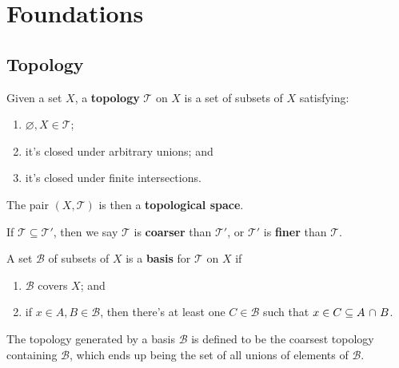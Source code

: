 \documentclass[twoside,10pt]{report}
\begin{document}
\toc


\chapter{Foundations}

\section{Topology}

\begin{defn}[]
Given a set $X$, a \textbf{topology} $\mathcal{T}$ on $X$ is a set of subsets of $X$ satisfying:
\begin{enumerate}
	\item $\varnothing, X \in \mathcal{T}$;
	\item it's closed under arbitrary unions; and
	\item it's closed under finite intersections.
\end{enumerate}
The pair $(X, \mathcal{T})$ is then a \textbf{topological space}.
\end{defn}

\noindent If $\mathcal{T} \subseteq \mathcal{T}'$, then we say $\mathcal{T}$ is \textbf{coarser} than $\mathcal{T}'$, or $\mathcal{T}'$ is \textbf{finer} than $\mathcal{T}$.

\begin{defn}[]
A set $\mathcal{B}$ of subsets of $X$ is a \textbf{basis} for $\mathcal{T}$ on $X$ if
\begin{enumerate}
	\item $\mathcal{B}$ covers $X$; and
	\item if $x \in A, B \in \mathcal{B}$, then there's at least one $C \in \mathcal{B}$ such that $x \in C \subseteq A \operatorname{\,\cap\,} B$.
\end{enumerate}
\end{defn}

\noindent The topology generated by a basis $\mathcal{B}$ is defined to be the coarsest topology containing $\mathcal{B}$, which ends up being the set of all unions of elements of $\mathcal{B}$.

\end{document}
